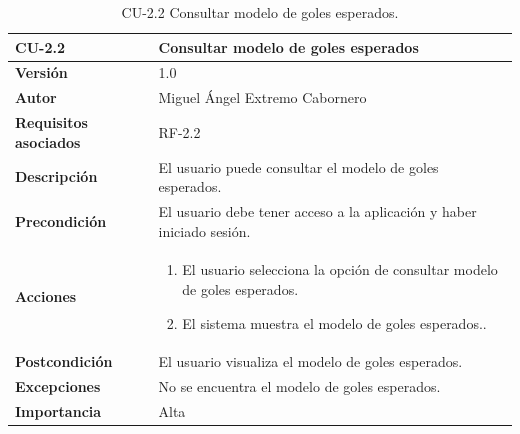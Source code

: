 \begin{table}[p]
    \centering
    \begin{tabularx}{\linewidth}{ p{} p{} }
        \toprule
        \textbf{CU-2.2}    & \textbf{Consultar modelo de goles esperados}\\
        \toprule
        \textbf{Versión}              & 1.0    \\
        \textbf{Autor}                & Miguel Ángel Extremo Cabornero \\
        \textbf{Requisitos asociados} & RF-2.2 \\
        \textbf{Descripción}          & El usuario puede consultar el modelo de goles esperados. \\
        \textbf{Precondición}         & El usuario debe tener acceso a la aplicación y haber iniciado sesión. \\
        \textbf{Acciones}             &
        \begin{enumerate}
            \item El usuario selecciona la opción de consultar modelo de goles esperados.
            \item El sistema muestra el modelo de goles esperados..
        \end{enumerate}\\
        \textbf{Postcondición}        & El usuario visualiza el modelo de goles esperados. \\
        \textbf{Excepciones}          & No se encuentra el modelo de goles esperados. \\
        \textbf{Importancia}          & Alta \\
        \bottomrule
    \end{tabularx}
    \caption{CU-2.2 Consultar modelo de goles esperados.}
\end{table}


